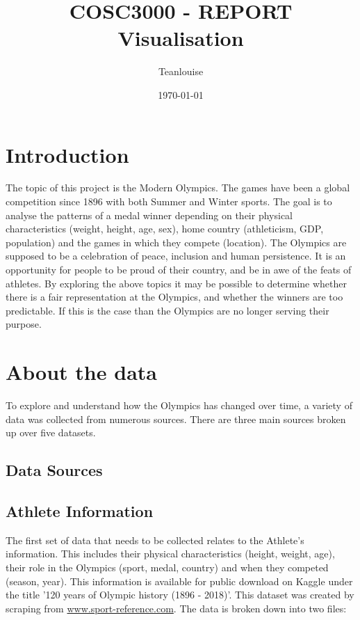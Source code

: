 \documentclass[a4 paper, 12pt]{article}
\title{COSC3000 - REPORT \\ Visualisation}
\author{Teanlouise}
\date{\today}
\begin{document}
\maketitle

\pagebreak
\tableofcontents

\pagebreak
\section{Introduction}
The topic of this project is the Modern Olympics. The games have been a global competition since 1896 with both Summer and Winter sports. The goal is to analyse the patterns of a medal winner depending on their physical characteristics (weight, height, age, sex), home country (athleticism, GDP, population) and the games in which they compete (location). The Olympics are supposed to be a celebration of peace, inclusion and human persistence. It is an opportunity for people to be proud of their country, and be in awe of the feats of athletes. By exploring the above topics it may be possible to determine whether there is a fair representation at the Olympics, and whether the winners are too predictable. If this is the case than the Olympics are no longer serving their purpose.

\section{About the data}
To explore and understand how the Olympics has changed over time, a variety of data was collected from numerous sources. There are three main sources broken up over five datasets. 

\subsection{Data Sources}

    \subsection{Athlete Information}
    The first set of data that needs to be collected relates to the Athlete's information. This includes their physical characteristics (height, weight, age), their role in the Olympics (sport, medal, country) and when they competed (season, year). This information is available for public download on Kaggle under the title '120 years of Olympic history (1896 - 2018)'. This dataset was created by scraping from \url{www.sport-reference.com}. The data is broken down into two files:
\end{document}
